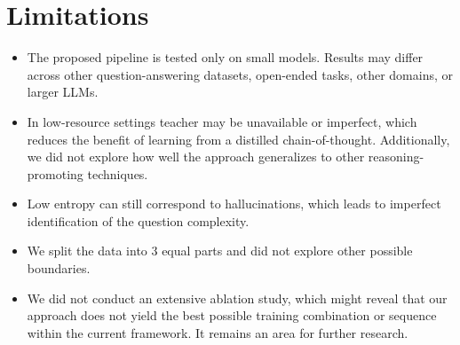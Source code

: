 \section*{Limitations}

\begin{itemize}
    \item The proposed pipeline is tested only on small models. Results may differ across other question-answering datasets, open-ended tasks, other domains, or larger LLMs.
    \item In low-resource settings teacher may be unavailable or imperfect, which reduces the benefit of learning from a distilled chain-of-thought. Additionally, we did not explore how well the approach generalizes to other reasoning-promoting techniques.
    \item Low entropy can still correspond to hallucinations, which leads to imperfect identification of the question complexity.
    \item We split the data into 3 equal parts and did not explore other possible boundaries.
    \item We did not conduct an extensive ablation study, which might reveal that our approach does not yield the best possible training combination or sequence within the current framework. It remains an area for further research.
\end{itemize}